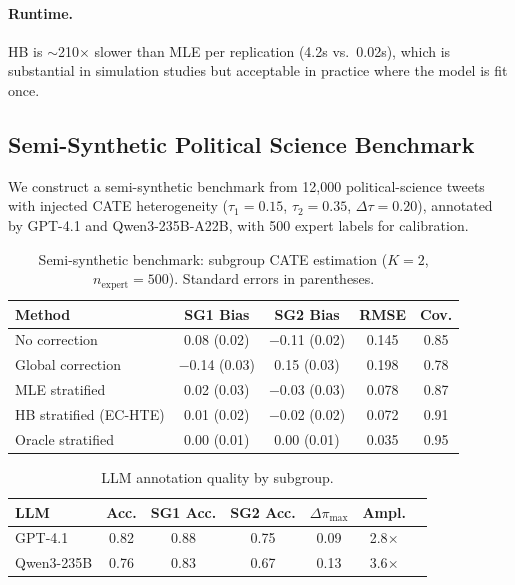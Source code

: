 \documentclass[11pt,a4paper]{article}
\begin{document}
\paragraph{Runtime.}
HB is $\sim$210$\times$ slower than MLE per replication (4.2s vs.\ 0.02s), which is substantial in simulation studies but acceptable in practice where the model is fit once.

\subsection{Semi-Synthetic Political Science Benchmark}
\label{sec:semisynthetic}

We construct a semi-synthetic benchmark from 12{,}000 political-science tweets with injected CATE heterogeneity ($\tau_1 = 0.15$, $\tau_2 = 0.35$, $\Delta\tau = 0.20$), annotated by GPT-4.1 and Qwen3-235B-A22B, with 500 expert labels for calibration.

\begin{table}[t]
\centering
\small
\caption{Semi-synthetic benchmark: subgroup CATE estimation ($K=2$, $n_{\text{expert}}=500$). Standard errors in parentheses.}
\label{tab:semisynthetic}
\begin{tabular}{lcccc}
\toprule
Method & SG1 Bias & SG2 Bias & RMSE & Cov. \\
\midrule
No correction & 0.08 (0.02) & $-$0.11 (0.02) & 0.145 & 0.85 \\
Global correction & $-$0.14 (0.03) & 0.15 (0.03) & 0.198 & 0.78 \\
MLE stratified & 0.02 (0.03) & $-$0.03 (0.03) & 0.078 & 0.87 \\
HB stratified (EC-HTE) & 0.01 (0.02) & $-$0.02 (0.02) & 0.072 & 0.91 \\
Oracle stratified & 0.00 (0.01) & 0.00 (0.01) & 0.035 & 0.95 \\
\bottomrule
\end{tabular}
\end{table}

\begin{table}[t]
\centering
\small
\caption{LLM annotation quality by subgroup.}
\label{tab:llm_quality}
\begin{tabular}{lcccccc}
\toprule
LLM & Acc. & SG1 Acc. & SG2 Acc. & $\Delta\pi_{\max}$ & Ampl. \\
\midrule
GPT-4.1 & 0.82 & 0.88 & 0.75 & 0.09 & 2.8$\times$ \\
Qwen3-235B & 0.76 & 0.83 & 0.67 & 0.13 & 3.6$\times$ \\
\bottomrule
\end{tabular}
\end{table}
\end{document}
